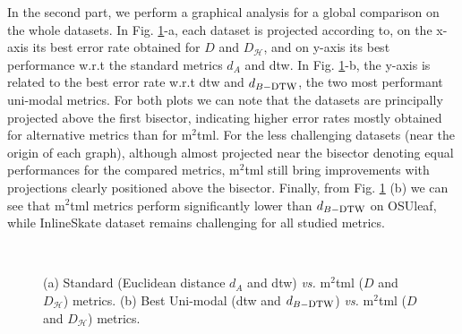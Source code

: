 In the second part,  we perform a graphical analysis for a global comparison on the whole datasets.  In Fig. \ref{fig:error2}-a,  each dataset is projected according to, on the x-axis its best error rate obtained for $D$ and  $D_{\mathcal{H}}$, and on y-axis  its best performance w.r.t  the standard metrics $d_A$  and  {\sc dtw}. In Fig. \ref{fig:error2}-b,  the y-axis is related to the best error rate w.r.t {\sc dtw} and $d_{B-\mbox{\sc dtw}}$, the two most performant uni-modal metrics. For both plots we can note that the datasets are principally  projected above the first bisector, indicating higher error rates mostly obtained for alternative metrics than for {\sc m}$^2${\sc tml}. For the less challenging datasets (near the origin of each graph), although almost projected near the bisector denoting equal performances for the compared metrics, {\sc m}$^2${\sc tml}  still  bring improvements with projections clearly positioned  above the bisector.  Finally, from Fig. \ref{fig:error2} (b) we can see that {\sc m}$^2${\sc tml} metrics perform significantly lower than $d_{B-\mbox{\sc dtw}}$ on OSUleaf, while InlineSkate dataset remains challenging for all studied metrics.

\begin{figure}[h!]
	\centering
	 \   
	\caption{(a) Standard (Euclidean distance $d_A$  and {\sc dtw}) {\it vs.} {\sc m}$^2${\sc tml} ($D$ and $D_{\mathcal{H}}$) metrics. (b) Best Uni-modal ({\sc dtw} and $d_{B-\mbox{\sc dtw}}$) {\it vs.} {\sc m}$^2${\sc tml} ($D$  and $D_{\mathcal{H}}$) metrics.}
	\label{fig:error2}
\end{figure}


